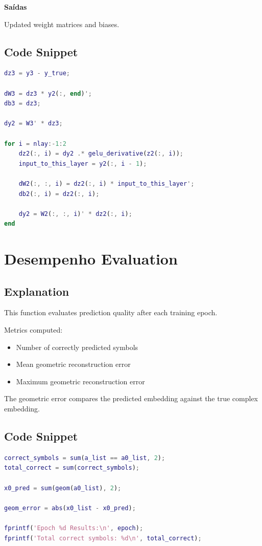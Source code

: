 \textbf{Saídas}

Updated weight matrices and biases.

\subsection{Code Snippet}

\begin{lstlisting}[language=Matlab]
dz3 = y3 - y_true;

dW3 = dz3 * y2(:, end)';
db3 = dz3;

dy2 = W3' * dz3;

for i = nlay:-1:2
    dz2(:, i) = dy2 .* gelu_derivative(z2(:, i));
    input_to_this_layer = y2(:, i - 1);

    dW2(:, :, i) = dz2(:, i) * input_to_this_layer';
    db2(:, i) = dz2(:, i);

    dy2 = W2(:, :, i)' * dz2(:, i);
end
\end{lstlisting}

\newpage

\section{Desempenho Evaluation}

\subsection{Explanation}

This function evaluates prediction quality after each training epoch.

Metrics computed:

\begin{itemize}
\item Number of correctly predicted symbols
\item Mean geometric reconstruction error
\item Maximum geometric reconstruction error
\end{itemize}

The geometric error compares the predicted embedding against the true complex embedding.

\subsection{Code Snippet}

\begin{lstlisting}[language=Matlab]
correct_symbols = sum(a_list == a0_list, 2);
total_correct = sum(correct_symbols);

x0_pred = sum(geom(a0_list), 2);

geom_error = abs(x0_list - x0_pred);

fprintf('Epoch %d Results:\n', epoch);
fprintf('Total correct symbols: %d\n', total_correct);
\end{lstlisting}

